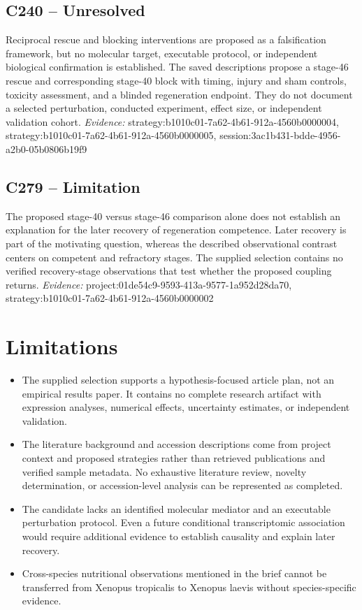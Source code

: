 \documentclass[11pt]{article}
\begin{document}
\subsection{C240 -- Unresolved}
Reciprocal rescue and blocking interventions are proposed as a falsification framework, but no molecular target, executable protocol, or independent biological confirmation is established.
The saved descriptions propose a stage-46 rescue and corresponding stage-40 block with timing, injury and sham controls, toxicity assessment, and a blinded regeneration endpoint. They do not document a selected perturbation, conducted experiment, effect size, or independent validation cohort.
\textit{Evidence: }strategy:b1010c01-7a62-4b61-912a-4560b0000004, strategy:b1010c01-7a62-4b61-912a-4560b0000005, session:3ac1b431-bdde-4956-a2b0-05b0806b19f9
\subsection{C279 -- Limitation}
The proposed stage-40 versus stage-46 comparison alone does not establish an explanation for the later recovery of regeneration competence.
Later recovery is part of the motivating question, whereas the described observational contrast centers on competent and refractory stages. The supplied selection contains no verified recovery-stage observations that test whether the proposed coupling returns.
\textit{Evidence: }project:01de54c9-9593-413a-9577-1a952d28da70, strategy:b1010c01-7a62-4b61-912a-4560b0000002
\section{Limitations}
\begin{itemize}
\item The supplied selection supports a hypothesis-focused article plan, not an empirical results paper. It contains no complete research artifact with expression analyses, numerical effects, uncertainty estimates, or independent validation.
\item The literature background and accession descriptions come from project context and proposed strategies rather than retrieved publications and verified sample metadata. No exhaustive literature review, novelty determination, or accession-level analysis can be represented as completed.
\item The candidate lacks an identified molecular mediator and an executable perturbation protocol. Even a future conditional transcriptomic association would require additional evidence to establish causality and explain later recovery.
\item Cross-species nutritional observations mentioned in the brief cannot be transferred from Xenopus tropicalis to Xenopus laevis without species-specific evidence.
\end{itemize}
\end{document}

